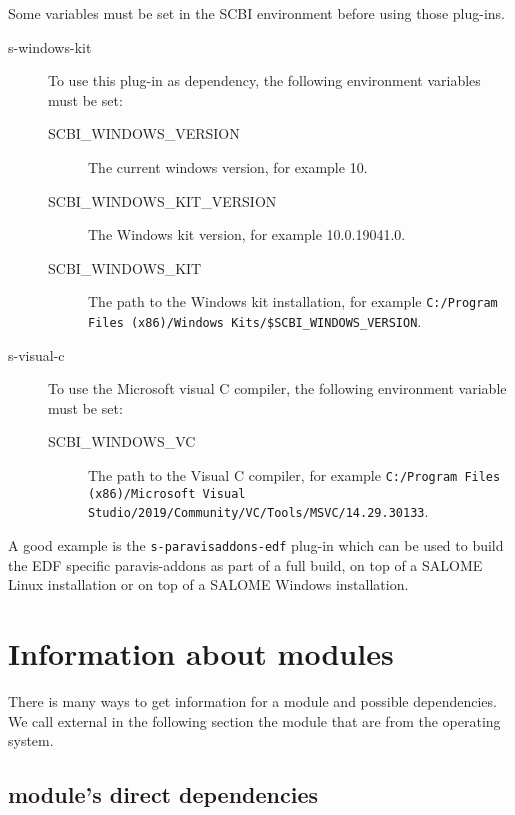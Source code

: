 \documentclass[a4paper,12pt,twoside]{article}
\newcommand{\code}[1]{\texttt{#1}}
\let\stdsection\section
\renewcommand\section{\newpage\stdsection}
\begin{document}
Some variables must be set in the SCBI environment before using those plug-ins.

\begin{description}
	\item[s-windows-kit] To use this plug-in as dependency, the following environment variables must be set:
	\begin{description}
		\item[SCBI\_WINDOWS\_VERSION] The current windows version, for example 10.
		\item[SCBI\_WINDOWS\_KIT\_VERSION] The Windows kit version, for example 10.0.19041.0.
		\item[SCBI\_WINDOWS\_KIT] The path to the Windows kit installation, for example \code{C:/Program Files (x86)/Windows Kits/\$SCBI\_WINDOWS\_VERSION}.
	\end{description}

	\item[s-visual-c] To use the Microsoft visual C compiler, the following environment variable must be set:

	\begin{description}
	\item[SCBI\_WINDOWS\_VC] The path to the Visual C compiler, for example \code{C:/Program Files (x86)/Microsoft Visual Studio/2019/Community/VC/Tools/MSVC/14.29.30133}.
	\end{description}

\end{description}

A good example is the \code{s-paravisaddons-edf} plug-in which can be used to build the EDF specific paravis-addons as part of a full build, on top of a SALOME Linux installation or on top of a SALOME Windows installation.


\section{Information about modules}
\label{information}

There is many ways to get information for a module and possible dependencies. We call external in the following section the module that are from the operating system.

\subsection{module's direct dependencies}
\end{document}
